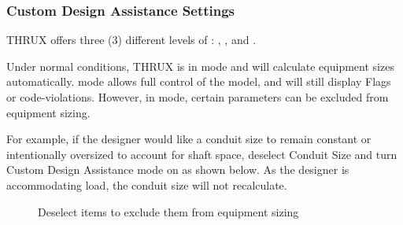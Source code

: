 \documentclass[letterpaper,10pt,english]{sphinxmanual}
\begin{document}
\subsubsection{Custom Design Assistance Settings}
\label{\detokenize{docs/userguide/projectsettings/customdesignassistancesettings/index-custom_design_assistance_settings:custom-design-assistance-settings}}\label{\detokenize{docs/userguide/projectsettings/customdesignassistancesettings/index-custom_design_assistance_settings:id1}}\label{\detokenize{docs/userguide/projectsettings/customdesignassistancesettings/index-custom_design_assistance_settings::doc}}
THRUX offers three (3) different levels of {\hyperref[\detokenize{docs/userguide/explorersandutilitytools/statusbar/index-status_bar:design-assistance}]{}}: {\hyperref[\detokenize{docs/userguide/explorersandutilitytools/statusbar/index-status_bar:full-design-assistance}]{}}, {\hyperref[\detokenize{docs/userguide/explorersandutilitytools/statusbar/index-status_bar:custom-design-assistance}]{}}, and {\hyperref[\detokenize{docs/userguide/explorersandutilitytools/statusbar/index-status_bar:no-design-assistance}]{}}.

Under normal conditions, THRUX is in {\hyperref[\detokenize{docs/userguide/explorersandutilitytools/statusbar/index-status_bar:full-design-assistance}]{}} mode and will calculate equipment sizes automatically.  {\hyperref[\detokenize{docs/userguide/explorersandutilitytools/statusbar/index-status_bar:no-design-assistance}]{}} mode allows full control of the model, and will still display Flags or code-violations.  However, in {\hyperref[\detokenize{docs/userguide/explorersandutilitytools/statusbar/index-status_bar:custom-design-assistance}]{}} mode, certain parameters can be excluded from equipment sizing.

For example, if the designer would like a conduit size to remain constant or intentionally oversized to account for shaft space, deselect Conduit Size and turn Custom Design Assistance mode on as shown below.  As the designer is accommodating load, the conduit size will not recalculate.

\begin{figure}[H]
\centering
\capstart

\noindent{}
\caption{Deselect items to exclude them from equipment sizing}\label{\detokenize{docs/userguide/projectsettings/customdesignassistancesettings/index-custom_design_assistance_settings:id2}}\end{figure}
\end{document}
